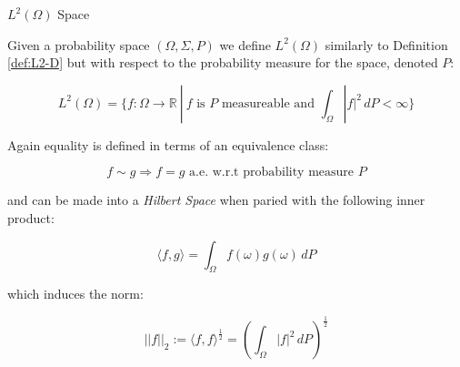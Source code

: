 \begin{definition}\label{def:L2-Omega}
    $L^2(\Omega)$ Space

    Given a probability space $(\Omega, \Sigma, P)$ we define $L^2(\Omega)$
    similarly to Definition \ref{def:L2-D} but with respect to
    the probability measure for the space, denoted $P$:

    \begin{equation}\label{eq:L2-Omega}
        L^2(\Omega) = \{f: \Omega \rightarrow \mathbb{R}\ |\
            f \text{ is } P \text{ measureable and }
            \int_\Omega|f|^2\, dP < \infty \}
    \end{equation}

    Again equality is defined in terms of an equivalence class:

    \[
        f \sim g \Rightarrow f = g \text{ a.e. w.r.t probability measure } P
    \]

    and can be made into a \textit{Hilbert Space} when paried with the
    following inner product:

    \begin{equation}\label{eq:L2-Omega-inner-prod}
        \langle f, g \rangle = \int_\Omega f(\omega)g(\omega)\, dP
    \end{equation}

    which induces the norm:

    \begin{equation}\label{eq:L2-Omega-norm}
        ||f||_2 := \langle f, f\rangle^{\frac{1}{2}}
                 = \left(\int_\Omega|f|^2\, dP\right)^{\frac{1}{2}}
    \end{equation}
\end{definition}

